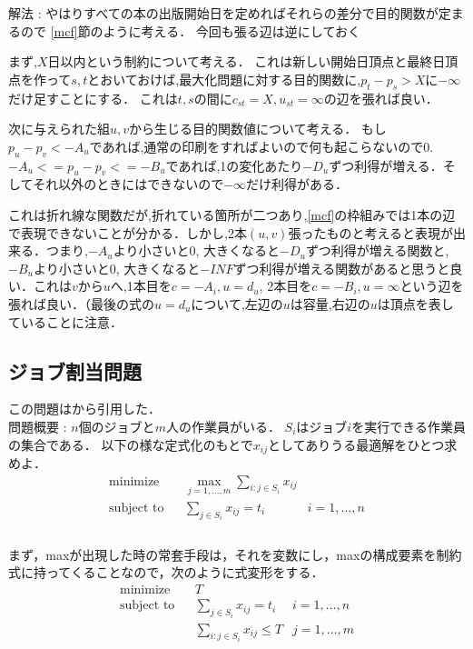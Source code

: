 \documentclass[13pt]{jarticle}
\theoremstyle{nonitalic} %
\begin{document}
解法 : 
やはりすべての本の出版開始日を定めればそれらの差分で目的関数が定まるので \ref{mcf}節のように考える．
今回も張る辺は逆にしておく

まず,$X$日以内という制約について考える．
これは新しい開始日頂点と最終日頂点を作って$s,t$とおいておけば,最大化問題に対する目的関数に,$p_t - p_s > X $に$- \infty$だけ足すことにする．
これは$t,s$の間に$c_{st} = X, u_{st}=\infty$の辺を張れば良い．

次に与えられた組$u,v$から生じる目的関数値について考える．
もし$p_u - p_v < -A_u$であれば,通常の印刷をすればよいので何も起こらないので0. $-A_u <= p_u - p_v <=  -B_u$であれば,1の変化あたり$-D_u$ずつ利得が増える．そしてそれ以外のときにはできないので$-\infty$だけ利得がある．

これは折れ線な関数だが,折れている箇所が二つあり,\ref{mcf}の枠組みでは1本の辺で表現できないことが分かる．しかし,2本$(u,v)$張ったものと考えると表現が出来る．つまり,$-A_u$より小さいと0, 大きくなると$-D_u$ずつ利得が増える関数と,$-B_u$より小さいと0, 大きくなると$-INF$ずつ利得が増える関数があると思うと良い．これは$v$から$u$へ,1本目を$c = -A_i, u=d_u$, 2本目を$c=-B_i, u=\infty$という辺を張れば良い．（最後の式の$u=d_u$について,左辺の$u$は容量,右辺の$u$は頂点を表していることに注意．


\subsection{ジョブ割当問題}
この問題は\cite{combopt}から引用した．\\

問題概要 : $n$個のジョブと$m$人の作業員がいる．
$S_i$はジョブ$i$を実行できる作業員の集合である．
以下の様な定式化のもとで$x_{ij}$としてありうる最適解をひとつ求めよ．
\begin{align}
  &&&&& \textrm{minimize}   && \max_{j=1,\dots,m} \sum_{i:j \in S_i} x_{ij} \\
  &&&&& \textrm{subject to} && \sum_{j \in S_i} x_{ij} = t_i  & i=1,\dots,n &&&&&\\
\end{align}\\


まず，maxが出現した時の常套手段は，それを変数にし，maxの構成要素を制約式に持ってくることなので，次のように式変形をする．
\begin{align}
  &&&&& \textrm{minimize}   && T \\
  &&&&& \textrm{subject to} && \sum_{j \in S_i} x_{ij} = t_i  & i=1,\dots,n &&&&&\\
  &&&&&                     &&  \sum_{i:j \in S_i} x_{ij} \leq T & j=1,\dots,m
\end{align}
\end{document}
